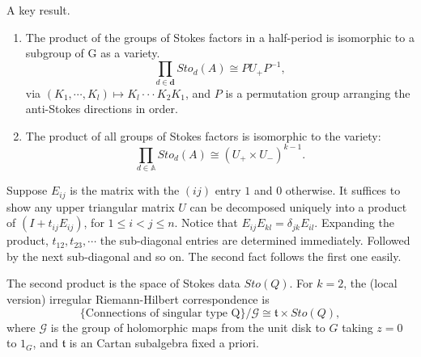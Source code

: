 A key result.
\begin{enumerate}
  \item The product of the groups of Stokes factors in a half-period is isomorphic to a subgroup of G as a variety.
    $$\prod_{d\in \textbf{d}}Sto_d(A) \cong PU_+P^{-1},$$
    via $(K_1,\dotsb,K_l)\mapsto K_l \cdot \cdot \cdot K_2K_1$, and $P$ is a permutation group arranging the anti-Stokes directions in order.
  \item The product of all groups of Stokes factors is isomorphic to the variety:
    $$\prod_{d\in \mathbb{A}}Sto_d(A) \cong (U_+\times U_-)^{k-1}.$$
\end{enumerate}

Suppose $E_{ij}$ is the matrix with the $(ij)$ entry $1$ and $0$ otherwise. It suffices to show any upper triangular matrix $U$ can be decomposed uniquely into a product of $(I+t_{ij}E_{ij})$, for $1\leq i < j\leq n$. Notice that $E_{ij}E_{kl} = \delta_{jk}E_{il}$. Expanding the product, $t_{12}, t_{23},\dotsb$ the sub-diagonal entries are determined immediately. Followed by the next sub-diagonal and so on. The second fact follows the first one easily.

The second product is the space of Stokes data $Sto(Q)$. For $k=2$, the (local version) irregular Riemann-Hilbert correspondence is
$$\{\text{Connections of singular type Q}\}/\mathcal {G} \cong \mathfrak{t} \times Sto(Q),$$
where $\mathcal {G}$ is the group of holomorphic maps from the unit disk to $G$ taking $z=0$ to $1_G$, and $\mathfrak{t}$ is an Cartan subalgebra fixed a priori.